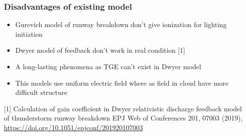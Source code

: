 \documentclass[8pt,pdf,hyperref={unicode}]{beamer}
\begin{document}
\begin{frame}
\frametitle{Disadvantages of existing model}
{\large \begin{itemize}
    \item Gurevich model of runway breakdown don't give ionization for lighting initiation
    \item Dwyer model of feedback don't work in real condition [1]
    \item A long-lasting phenomena as TGE  can't exist in Dwyer model
    \item This models use uniform electric field where as field in cloud have more difficult structure 
\end{itemize}}
\small{[1] Calculation of gain coefficient in Dwyer relativistic discharge feedback model of thunderstorm runway breakdown
    EPJ Web of Conferences 201, 07003 (2019), \url{https://doi.org/10.1051/epjconf/201920107003}}
\end{frame}
\end{document}
